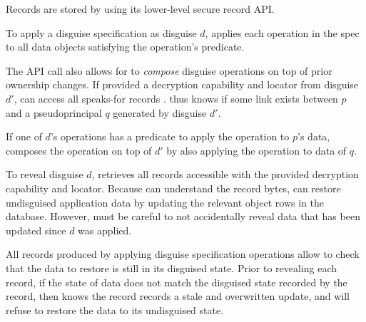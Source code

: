 Records are stored by \sys using its lower-level secure record API.

To apply a disguise specification as disguise $d$, \sys applies each operation in the spec to
all data objects satisfying the operation's predicate. 

The  API call also allows for \sys to \emph{compose} disguise operations on top of
prior ownership changes.
If provided a decryption capability and locator  from disguise $d'$, \sys can access all
speaks-for records
. \sys thus knows if some link exists between $p$ and a pseudoprincipal $q$ generated by
disguise $d'$.

If one of $d$'s operations has a predicate to apply the operation to $p$'s data, \sys
composes the operation on top of $d'$ by also applying the operation to data of $q$.

To reveal disguise $d$, \sys retrieves all records accessible with the provided decryption capability
and locator. Because \sys can understand the record bytes, \sys can restore undisguised application
data by updating the relevant object rows in the database.  However, \sys must be
careful to not accidentally reveal data that has been updated since $d$ was applied.  

All records produced by applying disguise specification operations allow \sys to check that the data
to restore is still in its disguised state. Prior to revealing each record, if the state of data does
not match the disguised state recorded by the record, then \sys knows the record records a stale and
overwritten update, and will refuse to restore the data to its undisguised state.
